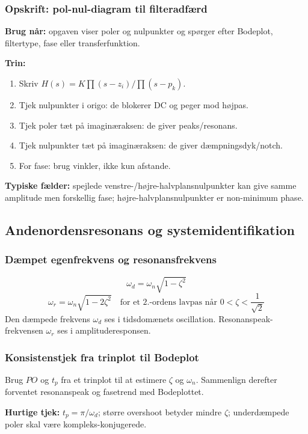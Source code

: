 \subsubsection{Opskrift: pol-nul-diagram til filteradfærd}
\textbf{Brug når:} opgaven viser poler og nulpunkter og spørger efter Bodeplot, filtertype, fase eller transferfunktion.

\textbf{Trin:}
\begin{enumerate}
    \item Skriv \(H(s)=K\prod(s-z_i)/\prod(s-p_k)\).
    \item Tjek nulpunkter i origo: de blokerer DC og peger mod højpas.
    \item Tjek poler tæt på imaginæraksen: de giver peaks/resonans.
    \item Tjek nulpunkter tæt på imaginæraksen: de giver dæmpningsdyk/notch.
    \item For fase: brug vinkler, ikke kun afstande.
\end{enumerate}

\textbf{Typiske fælder:} spejlede venstre-/højre-halvplansnulpunkter kan give samme amplitude men forskellig fase; højre-halvplansnulpunkter er non-minimum phase.

\subsection{Andenordensresonans og systemidentifikation}

\subsubsection{Dæmpet egenfrekvens og resonansfrekvens}
\[
\omega_d=\omega_n\sqrt{1-\zeta^2}
\]
\[
\omega_r=\omega_n\sqrt{1-2\zeta^2}\quad\text{for et 2.-ordens lavpas når }0<\zeta<\frac{1}{\sqrt{2}}
\]
Den dæmpede frekvens \(\omega_d\) ses i tidsdomænets oscillation. Resonanspeak-frekvensen \(\omega_r\) ses i amplituderesponsen.

\subsubsection{Konsistenstjek fra trinplot til Bodeplot}
Brug \(PO\) og \(t_p\) fra et trinplot til at estimere \(\zeta\) og \(\omega_n\). Sammenlign derefter forventet resonanspeak og fasetrend med Bodeplottet.

\textbf{Hurtige tjek:} \(t_p=\pi/\omega_d\); større overshoot betyder mindre \(\zeta\); underdæmpede poler skal være kompleks-konjugerede.

